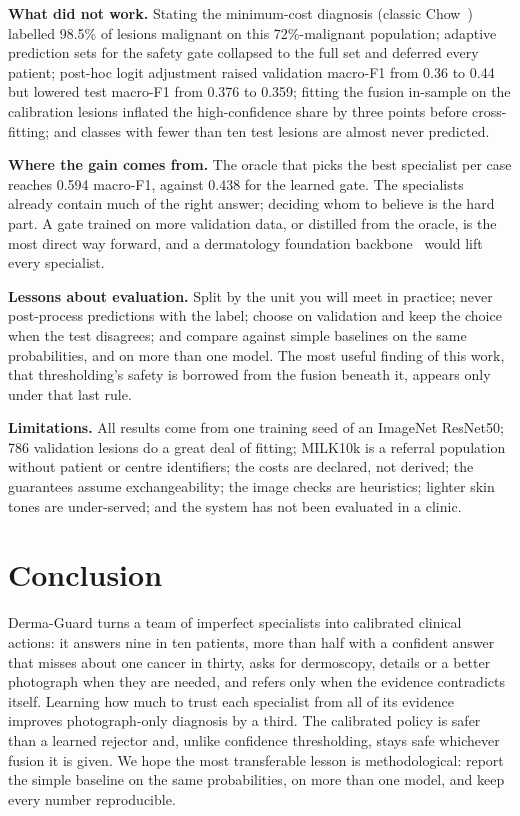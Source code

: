 \documentclass[conference]{IEEEtran}
\begin{document}
\textbf{What did not work.} Stating the minimum-cost diagnosis (classic Chow~\cite{r23}) labelled 98.5\% of lesions malignant on this 72\%-malignant population; adaptive prediction sets for the safety gate collapsed to the full set and deferred every patient; post-hoc logit adjustment raised validation macro-F1 from 0.36 to 0.44 but lowered test macro-F1 from 0.376 to 0.359; fitting the fusion in-sample on the calibration lesions inflated the high-confidence share by three points before cross-fitting; and classes with fewer than ten test lesions are almost never predicted.

\textbf{Where the gain comes from.} The oracle that picks the best specialist per case reaches 0.594 macro-F1, against 0.438 for the learned gate. The specialists already contain much of the right answer; deciding whom to believe is the hard part. A gate trained on more validation data, or distilled from the oracle, is the most direct way forward, and a dermatology foundation backbone~\cite{r10} would lift every specialist.

\textbf{Lessons about evaluation.} Split by the unit you will meet in practice; never post-process predictions with the label; choose on validation and keep the choice when the test disagrees; and compare against simple baselines on the same probabilities, and on more than one model. The most useful finding of this work, that thresholding's safety is borrowed from the fusion beneath it, appears only under that last rule.

\textbf{Limitations.} All results come from one training seed of an ImageNet ResNet50; 786 validation lesions do a great deal of fitting; MILK10k is a referral population without patient or centre identifiers; the costs are declared, not derived; the guarantees assume exchangeability; the image checks are heuristics; lighter skin tones are under-served; and the system has not been evaluated in a clinic.

\section{Conclusion}
Derma-Guard turns a team of imperfect specialists into calibrated clinical actions: it answers nine in ten patients, more than half with a confident answer that misses about one cancer in thirty, asks for dermoscopy, details or a better photograph when they are needed, and refers only when the evidence contradicts itself. Learning how much to trust each specialist from all of its evidence improves photograph-only diagnosis by a third. The calibrated policy is safer than a learned rejector and, unlike confidence thresholding, stays safe whichever fusion it is given. We hope the most transferable lesson is methodological: report the simple baseline on the same probabilities, on more than one model, and keep every number reproducible.
\end{document}
